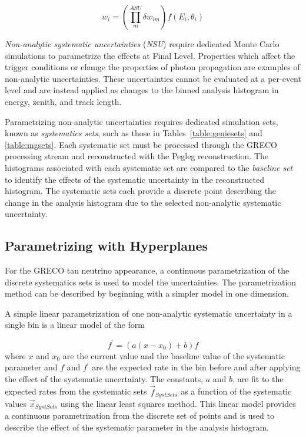 \begin{equation}
	w_i = \left( \prod_{m}^{ASU} \delta w_{im} \right) f(E_i, \theta_i)
\end{equation}

\emph{Non-analytic systematic uncertainties} (\emph{NSU}) require dedicated Monte Carlo simulations to parametrize the effects at Final Level.
Properties which affect the trigger conditions or change the properties of photon propagation are examples of non-analytic uncertainties.
These uncertainties cannot be evaluated at a per-event level and are instead applied as changes to the binned analysis histogram in energy, zenith, and track length.

Parametrizing non-analytic uncertainties requires dedicated simulation sets, known as \emph{systematics sets}, such as those in Tables~\ref{table:geniesets} and \ref{table:mgsets}.
Each systematic set must be processed through the GRECO processing stream and reconstructed with the Pegleg reconstruction.
The histograms associated with each systematic set are compared to the \emph{baseline set} to identify the effects of the systematic uncertainty in the reconstructed histogram.
The systematic sets each provide a discrete point describing the change in the analysis histogram due to the selected non-analytic systematic uncertainty.



\label{subsec:hyperplanes}
\subsection{Parametrizing with Hyperplanes}
For the GRECO tau neutrino appearance, a continuous parametrization of the discrete systematics sets is used to model the uncertainties.
The parametrization method can be described by beginning with a simpler model in one dimension.

A simple linear parametrization of one non-analytic systematic uncertainty in a single bin is a linear model of the form

\begin{equation}
	f^\prime = \left( a(x - x_0) + b\right) f
\end{equation}
%
where $x$ and $x_0$ are the current value and the baseline value of the systematic parameter and $f$ and $f^\prime$ are the expected rate in the bin before and after applying the effect of the systematic uncertainty.
The constants, $a$ and $b$, are fit to the expected rates from the systematic sets $\vec{f}_{SystSets}$ as a function of the systematic values $\vec{x}_{SystSets}$ using the linear least squares method.
This linear model provides a continuous parametrization from the discrete set of points and is used to describe the effect of the systematic parameter in the analysis histogram.

